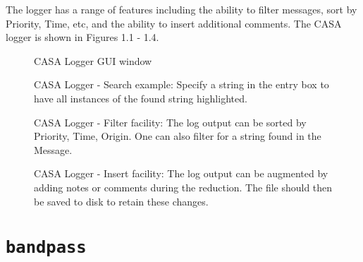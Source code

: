 The logger has a range of features including the ability to filter
messages, sort by Priority, Time, etc, and the ability to insert
additional comments. The CASA logger is shown in Figures 1.1 - 1.4.  

\begin{figure}[ht]
\caption{\label{fig:logger} CASA Logger GUI window}
\hrulefill
\end{figure}

\begin{figure}[h]
\caption{\label{fig:logger_search} CASA Logger - Search example:
Specify a string in the entry box to
have all instances of the found string highlighted.}
\hrulefill
\end{figure}

\begin{figure}[h]
\caption{\label{fig:logger_filter} CASA Logger - Filter facility: The
log output can be sorted by Priority, Time, Origin. One can also
filter for a string found in the Message.}  
\hrulefill
\end{figure}

\begin{figure}[h]
\caption{\label{fig:logger_insert} CASA Logger - Insert facility: The
log output can be augmented by adding notes or comments during the
reduction. The file should then be saved to disk to retain these
changes.}
\hrulefill
\end{figure}


\section{{\tt bandpass}}
\label{section:tasks.bandpass}

